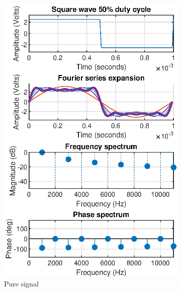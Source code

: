 \documentclass[notitlepage, a4paper, 11pt]{article}
\begin{document}
	\begin{figure}[H]
		\centering
		\begin{subfigure}[][][t]{0.26\textwidth}
			\includegraphics[width=\textwidth]{../Matlab/img/sqr50}
			\caption{Pure signal}
		\end{subfigure}
		\hfill
		\begin{subfigure}[][][t]{0.26\textwidth}

\end{subfigure}
\end{figure}
\end{document}
